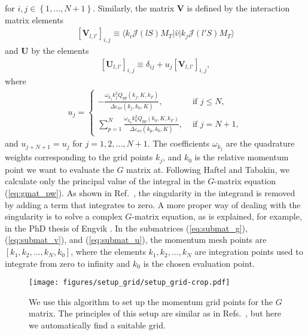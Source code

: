 \documentclass[a4paper,12pt]{report}
\begin{document}
for $i, j \in \left\{ 1, \dots , N+1\right\}$. Similarly, the matrix $\mathbf{V}$ is defined by the interaction matrix elements
\begin{align}
  \left[ \mathbf{V}_{l,l'}\right]_{i, j} \equiv \langle k_{i}\mathcal{J}(lS)M_{T}|\hat{v}|k_{j}\mathcal{J}(l'S)M_{T}\rangle
  \label{eq:submat_v}
\end{align}
and $\mathbf{U}$ by the elements
\begin{align}
  \left[ \mathbf{U}_{l,l'}\right]_{i, j} \equiv \delta_{ij} + u_{j}\left[ \mathbf{V}_{l,l'}\right]_{i, j}, 
  \label{eq:submat_u}
\end{align}
where 
\begin{align}
  u_{j} = \left\{ \begin{array}{ll}
    -\frac{\omega_{k_{j}}k_{j}^{2}Q_{pp}(k_{j}, K, k_{F})}{\Delta \varepsilon_{av}(k_{j}, k_{0}, K)}, & \text{ if } j \leq N, \\
      \sum_{p=1}^{N} \frac{\omega_{k_{p}}k_{0}^{2}Q_{pp}(k_{0}, K, k_{F})}{\Delta \varepsilon_{av}(k_{p}, k_{0}, K)}, & \text{ if } j = N+1,
    \end{array} \right. 
\end{align}
and $u_{j+N+1} = u_{j}$ for $j = 1, 2, \dots , N+1$. The coefficients $\omega_{k_{j}}$ are the quadrature weights corresponding to the grid points $k_{j}$, and $k_{0}$ is the relative momentum point we want to evaluate the $G$ matrix at. Following Haftel and Tabakin, we calculate only the principal value of the integral in the $G$-matrix equation (\ref{eq:gmat_pw}). As shown in Ref.~\cite{haftel_tabakin}, the singularity in the integrand is removed  by adding a term that integrates to zero. A more proper way of dealing with the singularity is to solve a complex $G$-matrix equation, as is explained, for example, in the PhD thesis of Engvik \cite{engvik_phd}. In the submatrices (\ref{eq:submat_g}), (\ref{eq:submat_v}), and (\ref{eq:submat_u}), the momentum mesh points are $[k_{1}, k_{2}, \dots , k_{N}, k_{0}]$, where the elements $k_{1}, k_{2}, \dots , k_{N}$ are integration points used to integrate from zero to infinity and $k_{0}$ is the chosen evaluation point.

\begin{figure}
  \centering
  \texttt{[image: figures/setup\_grid/setup\_grid-crop.pdf]}
  \caption{We use this algorithm to set up the momentum grid 
    points for the $G$ matrix. The principles of this setup
    are similar as in Refs.~\cite{ramos_phd, engvik_phd},
    but here we automatically find a suitable grid.}  
  \label{fig:setup_grid}
\end{figure}
\end{document}
